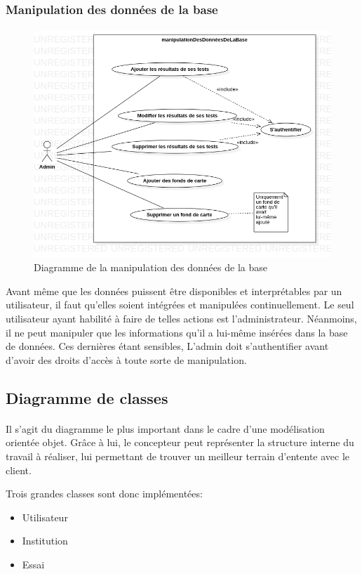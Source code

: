 \subsubsection{Manipulation des données de la base}
    \paragraph{}
    \begin{figure}
        \centering
        \includegraphics[width=1\textwidth]{images/Analyse_des_besoins/manipulationDesDonneesDeLaBase.png}
        \caption{Diagramme de la manipulation des données de la base}
    \end{figure}
    \par 
    Avant même que les données puissent être disponibles et interprétables 
    par un utilisateur, il faut qu'elles soient intégrées et manipulées continuellement. Le 
    seul utilisateur ayant habilité à faire de telles 
    actions est l'administrateur. Néanmoins, il ne peut manipuler que les informations 
    qu'il a lui-même insérées dans la base de données. Ces dernières étant sensibles, L'admin 
    doit s'authentifier avant d'avoir des droits d'accès à toute sorte de manipulation.

    \subsection{Diagramme de classes}
    \paragraph{}
    Il s'agit du diagramme le plus important dans le cadre 
    d'une modélisation orientée objet. Grâce à lui, le concepteur peut 
    représenter la structure interne du travail à réaliser, lui 
    permettant de trouver un meilleur terrain d'entente avec le client.
    \par 
    Trois grandes classes sont donc implémentées:
    \begin{itemize}
        \item Utilisateur
        \item Institution
        \item Essai 
    \end{itemize}
    \par 
    [TO BE CONTINUED - Take a look ds le fichier mdj]